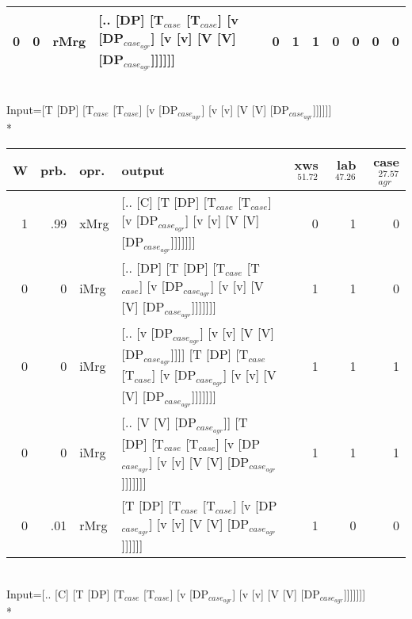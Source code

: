 \begin{tabularx}{\linewidth}{rrlXrrrrrrr}
   0 &   0 & rMrg & [.. [DP] [T$_{case}$ [T$_{case}$] [v [DP$_{case_{agr}}$] [v [v] [V [V] [DP$_{case_{agr}}$]]]]]]                                                                        &            0 &             1 &             1 &                  0 &              0 &                0 &              0 \\
\hline
\end{tabularx}\endgroup\\
\begingroup\scriptsize Input=[T [DP] [T$_{case}$ [T$_{case}$] [v [DP$_{case_{agr}}$] [v [v] [V [V] [DP$_{case_{agr}}$]]]]]]\\*
\begin{tabularx}{\linewidth}{rrlXrrr}
\hline
   W &   prb. & opr.   & output                                                                                                                          &   xws$^{51.72}$ &   lab$^{47.26}$ &   case$_{agr}^{27.57}$ \\
\hline
   1 &   .99 & xMrg & [.. [C] [T [DP] [T$_{case}$ [T$_{case}$] [v [DP$_{case_{agr}}$] [v [v] [V [V] [DP$_{case_{agr}}$]]]]]]]                                             &             0 &             1 &                  0 \\
   0 &   0 & iMrg & [.. [DP] [T [DP] [T$_{case}$ [T$_{case}$] [v [DP$_{case_{agr}}$] [v [v] [V [V] [DP$_{case_{agr}}$]]]]]]]                                            &             1 &             1 &                  0 \\
   0 &   0 & iMrg & [.. [v [DP$_{case_{agr}}$] [v [v] [V [V] [DP$_{case_{agr}}$]]]] [T [DP] [T$_{case}$ [T$_{case}$] [v [DP$_{case_{agr}}$] [v [v] [V [V] [DP$_{case_{agr}}$]]]]]]] &             1 &             1 &                  1 \\
   0 &   0 & iMrg & [.. [V [V] [DP$_{case_{agr}}$]] [T [DP] [T$_{case}$ [T$_{case}$] [v [DP$_{case_{agr}}$] [v [v] [V [V] [DP$_{case_{agr}}$]]]]]]]                           &             1 &             1 &                  1 \\
   0 &   .01 & rMrg & [T [DP] [T$_{case}$ [T$_{case}$] [v [DP$_{case_{agr}}$] [v [v] [V [V] [DP$_{case_{agr}}$]]]]]]                                                      &             1 &             0 &                  0 \\
\hline
\end{tabularx}\endgroup\\
\begingroup\scriptsize Input=[.. [C] [T [DP] [T$_{case}$ [T$_{case}$] [v [DP$_{case_{agr}}$] [v [v] [V [V] [DP$_{case_{agr}}$]]]]]]]\\*
